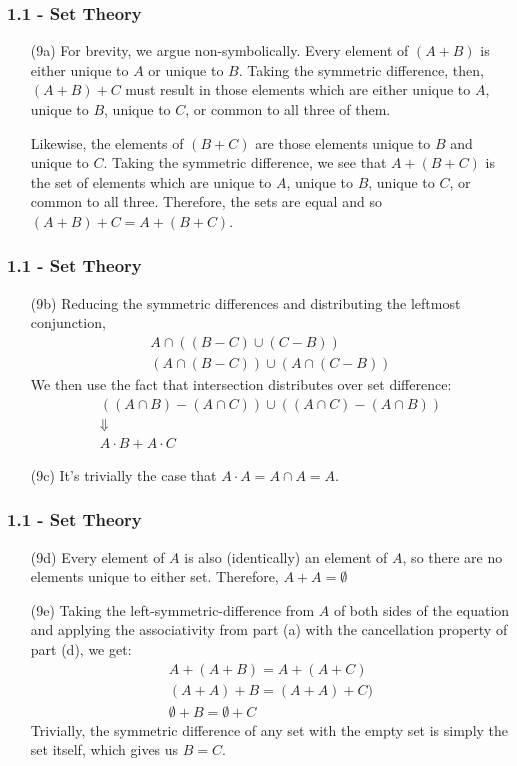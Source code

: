 \documentclass{beamer}
\begin{document}
\begin{frame}
\frametitle{1.1 - Set Theory}
\small
\begin{enumerate}
	\item[(9a)] \quad For brevity, we argue non-symbolically. Every element of $(A+B)$ is either unique to $A$ or unique to $B$. Taking the symmetric difference, then, $(A+B)+C$ must result in those elements which are either unique to $A$, unique to $B$, unique to $C$, or common to all three of them. 
	
	\quad Likewise, the elements of $(B+C)$ are those elements unique to $B$ and unique to $C$. Taking the symmetric difference, we see that $A+(B+C)$ is the set of elements which are unique to $A$, unique to $B$, unique to $C$, or common to all three. Therefore, the sets are equal and so $(A+B)+C=A+(B+C)$. 
\end{enumerate}
\end{frame}
\begin{frame}
\frametitle{1.1 - Set Theory}
\small
\begin{enumerate}
	\item[(9b)] Reducing the symmetric differences and distributing the leftmost conjunction,
	\begin{gather*}
	A\cap\left((B-C)\cup(C-B)\right) \\
	\left(A\cap(B - C)\right)\cup\left(A\cap(C - B)\right)
	\end{gather*}
	We then use the fact that intersection distributes over set difference:
	\begin{gather*}
	\left((A\cap B)-(A\cap C)\right)\cup\left((A\cap C) - (A\cap B)\right)\\
	\Downarrow \\
	A\cdot B + A\cdot C
	\end{gather*}
	\item[(9c)] It's trivially the case that $A\cdot A = A\cap A = A$.
\end{enumerate}
\end{frame}
\begin{frame}
\frametitle{1.1 - Set Theory}
\small
\begin{enumerate}
	\item[(9d)] Every element of $A$ is also (identically) an element of $A$, so there are no elements unique to either set. Therefore, $A+A=\emptyset$
	\item[(9e)] Taking the left-symmetric-difference from $A$ of both sides of the equation and applying the associativity from part (a) with the cancellation property of part (d), we get:
	\begin{gather*}
	A+(A+B)=A+(A+C) \\
	(A+A)+B=(A+A)+C) \\
	\emptyset + B = \emptyset + C
	\end{gather*}
	Trivially, the symmetric difference of any set with the empty set is simply the set itself, which gives us $B = C$.
\end{enumerate}
\end{frame}
\end{document}
